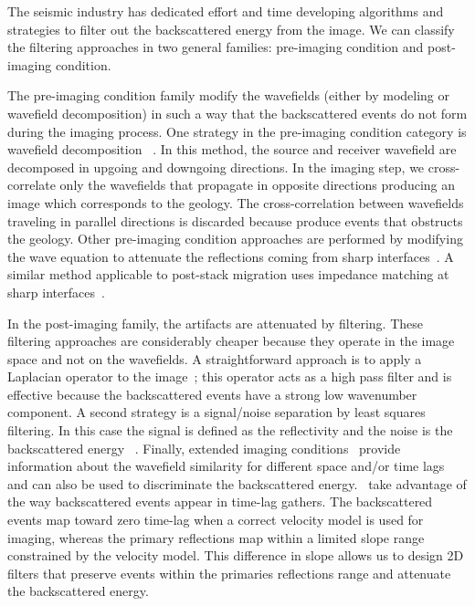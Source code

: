 The seismic industry has dedicated effort and time developing algorithms and strategies
to filter out the backscattered energy from the image. We can classify the filtering
 approaches in two general families: pre-imaging condition and post-imaging condition. 

The pre-imaging condition family modify the wavefields (either by modeling or wavefield decomposition)
 in such a way that the backscattered events do not form during the imaging process.
One strategy in the pre-imaging condition category is wavefield decomposition
~\citep[]{liu:S29,fei:3130}. In this method, the source and receiver wavefield are decomposed in upgoing
and downgoing directions. 
In the imaging step, we cross-correlate only the wavefields that propagate
in opposite directions producing an image which corresponds to the geology. The cross-correlation between wavefields traveling
in parallel directions is discarded because produce events that obstructs the geology. Other pre-imaging 
condition approaches are performed by modifying  the wave equation to attenuate the reflections coming from 
sharp interfaces~\citep{fletcher:2049}. A similar method applicable to post-stack migration 
uses impedance matching at sharp interfaces~\citep{baysal:132}. 

In the post-imaging family, the artifacts are attenuated by filtering. These filtering approaches
 are considerably cheaper because they operate in the image space and not on the wavefields. A straightforward
 approach is to apply a Laplacian operator to the image~\citep{youn:246}; this operator
 acts as a high pass filter and is effective because the backscattered events have a strong low wavenumber
component. A second strategy is a signal/noise  separation by least squares filtering. In
 this case the signal is defined as the reflectivity and the noise is the backscattered energy
~\citep{guitton:S19}. Finally, extended imaging conditions~\citep{rickett:883,sava:S209,GPR:GPR888} provide information
 about the wavefield similarity for different space and/or time lags and can also be used to discriminate
the backscattered energy.~\cite{kaelin:3125} take advantage of the way backscattered events appear in 
time-lag gathers. The backscattered events map toward zero time-lag when a correct velocity model is used for imaging,
 whereas the primary reflections map within a limited slope range constrained by the velocity model. This difference in
 slope allows us to design 2D filters that preserve events within the primaries reflections range and
attenuate the backscattered energy.

